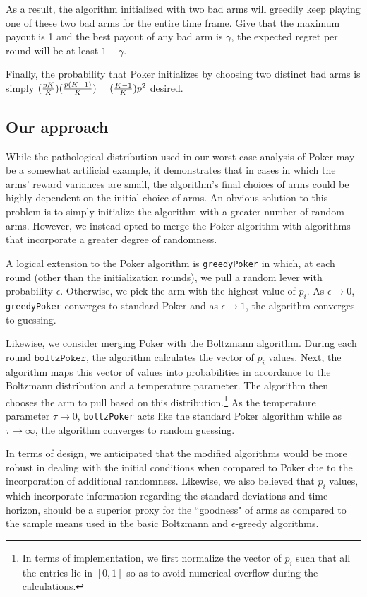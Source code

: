 \documentclass[12pt]{article}
\begin{document}
As a result, the algorithm initialized with two bad arms will greedily keep playing one of these two bad arms for the entire time frame. Give that the maximum payout is 1 and the best payout of any bad arm is $\gamma$, the expected regret per round will be at least $1-\gamma$. 

Finally, the probability that Poker initializes by choosing two distinct bad arms is simply $({pK\over{K}})({p(K-1)\over{K}}) = ({K-1\over K})p^{2}$ desired.

\subsection{Our approach}

While the pathological distribution used in our worst-case analysis of Poker may be a somewhat artificial example, it demonstrates that in cases in which the arms' reward variances are small, the algorithm's final choices of arms could be highly dependent  on the initial choice of arms. An obvious solution to this problem is to simply initialize the algorithm with a greater number of random arms. However, we instead opted to merge the Poker algorithm with algorithms that incorporate a greater degree of randomness.

A logical extension to the Poker algorithm is \texttt{greedyPoker} in which, at each round (other than the initialization rounds), we pull a random lever with probability $\epsilon$. Otherwise, we pick the arm with the highest value of $p_{i}$. As $\epsilon \to 0$, \texttt{greedyPoker} converges to standard Poker and as $\epsilon \to 1$, the algorithm converges to guessing.

Likewise, we consider merging Poker with the Boltzmann algorithm. During each round $\texttt{boltzPoker}$, the algorithm calculates the vector of $p_{i}$ values. Next, the algorithm maps this vector of values into probabilities in accordance to the Boltzmann distribution and a temperature parameter. The algorithm then chooses the arm to pull based on this distribution.\footnote{In terms of implementation, we first normalize the vector of $p_{i}$ such that all the entries lie in $[0,1]$ so as to avoid numerical overflow during the calculations.} As the temperature parameter $\tau \to 0$, \texttt{boltzPoker} acts like the standard Poker algorithm while as $\tau \to \infty$, the algorithm converges to random guessing.

In terms of design, we anticipated that the modified algorithms would be more robust in dealing with the initial conditions when compared to Poker due to the incorporation of additional randomness. Likewise,  we also believed that $p_{i}$ values, which incorporate information regarding the standard deviations and time horizon, should be a superior proxy for the ``goodness" of arms as compared to the sample means used in the basic Boltzmann and $\epsilon$-greedy algorithms.
\end{document}
